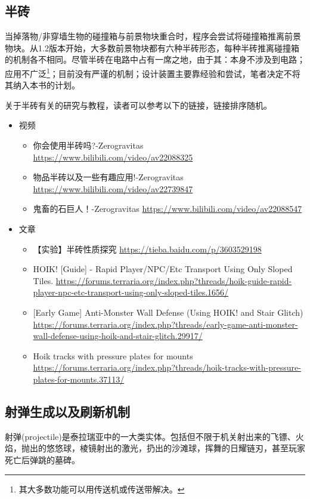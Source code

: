 \subsection{半砖}

当掉落物/非穿墙生物的碰撞箱与前景物块重合时，程序会尝试将碰撞箱推离前景物块。从1.2版本开始，大多数前景物块都有六种半砖形态，每种半砖推离碰撞箱的机制各不相同。尽管半砖在电路中占有一席之地，由于其：本身不涉及到电路；应用不广泛\footnote{其大多数功能可以用传送机或传送带解决。}；目前没有严谨的机制；设计装置主要靠经验和尝试，笔者决定不将其纳入本书的计划。

关于半砖有关的研究与教程，读者可以参考以下的链接，链接排序随机。

\begin{itemize}
\item 视频
\begin{itemize}
\item 你会使用半砖吗?-Zerogravitas \url{https://www.bilibili.com/video/av22088325}
\item 物品半砖以及一些有趣应用!-Zerogravitas \url{https://www.bilibili.com/video/av22739847}
\item 鬼畜的石巨人！-Zerogravitas \url{https://www.bilibili.com/video/av22088547}
\end{itemize}
\item 文章
\begin{itemize}
\item 【实验】半砖性质探究 \url{https://tieba.baidu.com/p/3603529198}
\item HOIK! [Guide] - Rapid Player/NPC/Etc Transport Using Only Sloped Tiles. \url{https://forums.terraria.org/index.php?threads/hoik-guide-rapid-player-npc-etc-transport-using-only-sloped-tiles.1656/}
\item {[}Early Game] Anti-Monster Wall Defense (Using HOIK! and Stair Glitch) \url{https://forums.terraria.org/index.php?threads/early-game-anti-monster-wall-defense-using-hoik-and-stair-glitch.29917/}
\item Hoik tracks with pressure plates for mounts \url{https://forums.terraria.org/index.php?threads/hoik-tracks-with-pressure-plates-for-mounts.37113/}
\end{itemize}
\end{itemize}

\subsection{射弹生成以及刷新机制}
射弹(projectile)是泰拉瑞亚中的一大类实体。包括但不限于机关射出来的飞镖、火焰，抛出的悠悠球，棱镜射出的激光，扔出的沙滩球，挥舞的日耀链刃，甚至玩家死亡后弹跳的墓碑。

